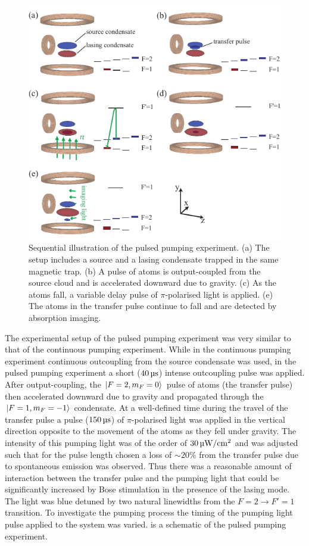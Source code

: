 \begin{figure}
    \centering
    \includegraphics[width=12cm]{PulsedPumpingScheme}
    \caption{Sequential illustration of the pulsed pumping experiment. (a) The setup includes a source and a lasing condensate trapped in the same magnetic trap. (b) A pulse of atoms is output-coupled from the source cloud and is accelerated downward due to gravity. (c) As the atoms fall, a variable delay pulse of $\pi$-polarised light is applied. (e) The atoms in the transfer pulse continue to fall and are detected by absorption imaging.}
    \label{OpticalPumping:PulsedPumpingScheme}
\end{figure}


The experimental setup of the pulsed pumping experiment was very similar to that of the continuous pumping experiment.  While in the continuous pumping experiment continuous outcoupling from the source condensate was used, in the pulsed pumping experiment a short ($\unit[40]{\micro s}$) intense outcoupling pulse was applied.  After output-coupling, the ${\left|F=2, m_F=0\right>}$ pulse of atoms (the transfer pulse) then accelerated downward due to gravity and propagated through the ${\left|F=1, m_F=-1\right>}$ condensate.  At a well-defined time during the travel of the transfer pulse a pulse ($\unit[150]{\micro s}$) of $\pi$-polarised light was applied in the vertical direction opposite to the movement of the atoms as they fell under gravity.  The intensity of this pumping light was of the order of $\unit[30]{\micro W/cm\textsuperscript{2}}$ and was adjusted such that for the pulse length chosen a loss of $\sim 20\%$ from the transfer pulse due to spontaneous emission was observed.  Thus there was a reasonable amount of interaction between the transfer pulse and the pumping light that could be significantly increased by Bose stimulation in the presence of the lasing mode.  The light was blue detuned by two natural linewidths from the $F=2 \rightarrow F'=1$ transition.  To investigate the pumping process the timing of the pumping light pulse applied to the system was varied.   is a schematic of the pulsed pumping experiment.

